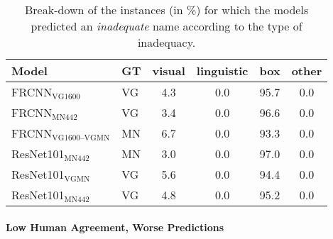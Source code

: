 \begin{table}[t]
	\centering
	\small
	\begin{tabular}{l|l|c@{~}c@{~}c@{~}c}
		\toprule
		{Model} &  GT & visual &  linguistic &  box &  other \\
		\midrule
		FRCNN$_{\text{VG1600}}$ & VG &             4.3 &                 0.0 &                  95.7 &            0.0 \\
		FRCNN$_{\text{MN442}}$ & VG &             3.4 &                 0.0 &                  96.6 &            0.0 \\
		\midrule
		FRCNN$_{\text{VG1600--VGMN}}$ & MN &             6.7 &                 0.0 &                  93.3 &            0.0 \\
		\midrule
		ResNet101$_{\text{MN442}}$ & MN &             3.0 &                 0.0 &                  97.0 &            0.0 \\
		ResNet101$_{\text{VGMN}}$ & VG &             5.6 &                 0.0 &                  94.4 &            0.0 \\
		ResNet101$_{\text{MN442}}$ & VG &             4.8 &                 0.0 &                  95.2 &            0.0 \\
		\bottomrule
	\end{tabular}
	\caption{Break-down of the instances (in \%) for which the models predicted an \textit{inadequate} name according to the type of inadequacy.  \label{tab:exp_inadequacy}}
\end{table}
%	

\paragraph{Low Human Agreement, Worse Predictions}

